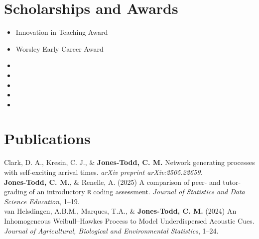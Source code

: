 \documentclass[10pt,a4paper]{moderncv}
\begin{document}
\section{Scholarships and Awards}
\vspace{2pt}
\begin{itemize}
  \item { {Innovation in Teaching Award}{}{}{}}
\item { {Worsley Early Career Award}{}{}{}}
  \item {}
  \item {}
 \item {}
 \item{}
   \item{}
  \vspace{2pt}

\end{itemize}
\newpage
  \section{Publications}


Clark, D. A., Kresin, C. J., \&  \textbf{Jones-Todd, C. M.} Network generating processes with self-exciting arrival times. \textit{arXiv preprint arXiv:2505.22659}.\\

\textbf{Jones-Todd, C. M.}, \& Renelle, A. (2025) A comparison of peer- and tutor-grading of an introductory \texttt{R} coding assessment. \textit{Journal of Statistics and Data Science Education}, 1--19.\\

  van Helsdingen, A.B.M., Marques, T.A., \& \textbf{Jones-Todd, C. M.} (2024) An Inhomogeneous Weibull–Hawkes Process to Model Underdispersed Acoustic Cues. \textit{Journal of Agricultural, Biological and Environmental Statistics}, 1--24.\\
\end{document}

